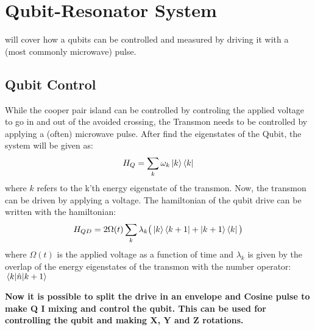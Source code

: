 \chapter{Qubit-Resonator System}
 will cover how a qubits can be controlled and measured by driving it with a (most commonly microwave) pulse. 


\section{Qubit Control}
While the cooper pair island can be controlled by controling the applied voltage to go in and out of the avoided crossing, the Transmon needs to be controlled by applying a (often) microwave pulse. After find the eigenstates of the Qubit, the system will be given as:
\begin{equation}
    H_Q = \sum_k \omega_k \ket{k}\bra{k}
\end{equation}
where $k$ refers to the k'th energy eigenstate of the transmon. Now, the transmon can be driven by applying a voltage. The hamiltonian of the qubit drive can be written with the hamiltonian:
\begin{equation}
    H_{QD} = 2 \Omega(t) \sum_k \lambda_k \big(\ket{k}\bra{k + 1} + \ket{k + 1}\bra{k} \big)
\end{equation}
where $\Omega(t)$ is the applied voltage as a function of time and $\lambda_k$ is given by the overlap of the energy eigenstates of the transmon with the number operator: $\matrixel{k}{\hat{n}}{k+1}$ 

\textbf{Now it is possible to split the drive in an envelope and Cosine pulse to make Q I mixing and control the qubit. This can be used for controlling the qubit and making X, Y and Z rotations.}


